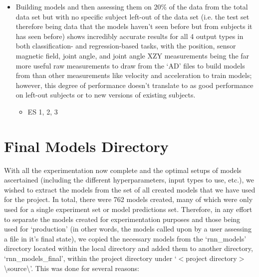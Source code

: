 \documentclass[12pt,twoside]{report}
\begin{document}
\begin{itemize}
\begin{itemize}
	\end{itemize}
	\item Building models and then assessing them on 20\% of the data from the total data set but with no specific subject left-out of the data set (i.e. the test set therefore being data that the models haven’t seen before but from subjects it has seen before) shows incredibly accurate results for all 4 output types in both classification- and regression-based tasks, with the position, sensor magnetic field, joint angle, and joint angle XZY measurements being the far more useful raw measurements to draw from the ‘AD’ files to build models from than other measurements like velocity and acceleration to train models; however, this degree of performance doesn’t translate to as good performance on left-out subjects or to new versions of existing subjects.
	\begin{itemize}
		\item ES 1, 2, 3
	\end{itemize}
\end{itemize}



\section{Final Models Directory}

\quad With all the experimentation now complete and the optimal setups of models ascertained (including the different hyperparameters, input types to use, etc.), we wished to extract the models from the set of all created models that we have used for the project. In total, there were 762 models created, many of which were only used for a single experiment set or model predictions set. Therefore, in any effort to separate the models created for experimentation purposes and those being used for ‘production’ (in other words, the models called upon by a user assessing a file in it’s final state), we copied the necessary models from the ‘rnn\_models’ directory located within the local directory and added them to another directory, ‘rnn\_models\_final’, within the project directory under ‘$<$project directory$>$\textbackslash source\textbackslash’. This was done for several reasons:
\end{document}
